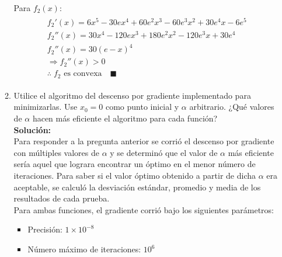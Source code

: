 \documentclass[10pt,letterpaper]{article}
\begin{document}
\begin{enumerate}
\begin{enumerate}
                    Para $f_2(x)$:
                    \begin{equation*} \begin{split} \begin{gathered}
                        f_2'(x) =  6 x^5  - 30 e x^4  + 60 e^2 x^3  - 60 e^3 x^2 + 30 e^4 x - 6 e^5  \\
                        f_2''(x) = 30 x^4 - 120 e x^3 + 180 e^2 x^2 - 120 e^3 x  + 30 e^4 \\
                        f_2''(x) = 30(e - x)^4 \\
                        \Rightarrow f_2''(x) > 0 \\
                        \therefore \; f_2 \text{ es convexa} \quad \blacksquare
                    \end{gathered} \end{split} \end{equation*}

                \item Utilice el algoritmo del descenso por gradiente implementado
                para minimizarlas. Use $x_0 = 0$ como punto inicial y $\alpha$
                arbitrario. ¿Qué valores de $\alpha$ hacen más eficiente el algoritmo
                para cada función? \\

                    \textbf{Solución:} \\
                    Para responder a la pregunta anterior se corrió el
                    descenso por gradiente con múltiples valores de $\alpha$
                    y se determinó que el valor de $\alpha$ más eficiente sería
                    aquel que lograra encontrar un óptimo en el menor número
                    de iteraciones. Para saber si el valor óptimo obtenido
                    a partir de dicha $\alpha$ era aceptable, se calculó la
                    desviación estándar, promedio y media de los resultados
                    de cada prueba. \\

                    Para ambas funciones, el gradiente corrió bajo los
                    siguientes parámetros:

                        \begin{itemize}
                            \item Precisión: $1 \times 10^{-8}$
                            \item Número máximo de iteraciones: $10^6$
                        \end{itemize}


\end{enumerate}
\end{enumerate}
\end{document}
